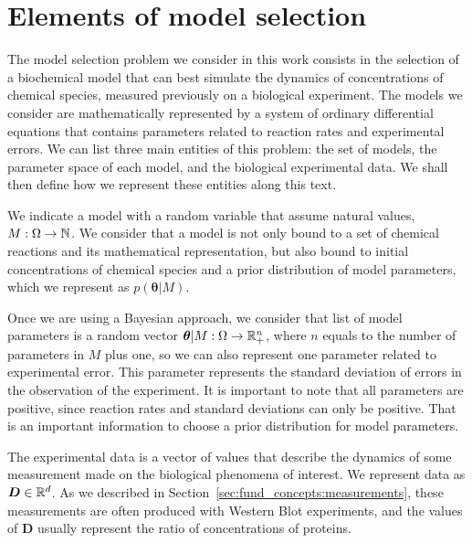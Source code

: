 \section{Elements of model selection}
The model selection problem we consider in this work consists in the
selection of a biochemical model that can best simulate the dynamics 
of concentrations of chemical species, measured previously on a 
biological experiment. The models we consider are mathematically 
represented by a system of ordinary differential equations that
contains parameters related to reaction rates and experimental errors.
We can list three main entities of this problem: the set of models, the 
parameter space of each model, and the biological experimental data.
We shall then define how we represent these entities along this text.

We indicate a model with a random variable that assume natural values, 
$M: \Omega \to \mathbb{N}$. We consider that a model is not only bound to
a set of chemical reactions and its mathematical representation, but 
also bound to initial concentrations of chemical species and a
prior distribution of model parameters, which we represent as $p({\bm
\theta} | M)$.

Once we are using a Bayesian approach, we consider that list of model
parameters is a random vector ${\bm\theta} | M: \Omega \to \mathbb{R}^{n}_+$,
where $n$ equals to the number of parameters in $M$ plus one, so we can
also represent one parameter related to experimental error. This
parameter represents the standard deviation of errors in the observation
of the experiment. It is important to note that all parameters are
positive, since reaction rates and standard deviations can only be
positive. That is an important information to choose a prior
distribution for model parameters.

The experimental data is a vector of values that describe the dynamics
of some measurement made on the biological phenomena of interest. We
represent data as ${\bm D} \in \mathbb{R}^{d}$. As we described in
Section~\ref{sec:fund_concepts:measurements}, these measurements are
often produced with Western Blot experiments, and the values of ${\bm D}$
usually represent the ratio of concentrations of proteins.

